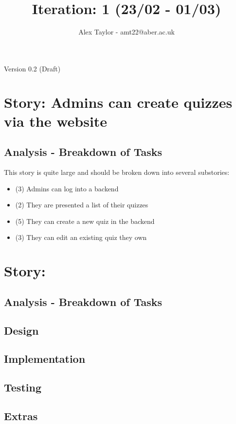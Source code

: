 \documentclass{article}
\title{Iteration: 1 (23/02 - 01/03)}
\author{Alex Taylor - amt22@aber.ac.uk}
\begin{document}
\maketitle
\begin{center}
	Version 0.2 (Draft)
\end{center}
\tableofcontents
\thispagestyle{empty}
\newpage

\section{Story: Admins can create quizzes via the website}
\subsection{Analysis - Breakdown of Tasks}
This story is quite large and should be broken down into several substories:
\begin{itemize}
	\item (3) Admins can log into a backend
	\item (2) They are presented a list of their quizzes
	\item (5) They can create a new quiz in the backend
	\item (3) They can edit an existing quiz they own
\end{itemize}
\newpage

\section{Story: }
\subsection{Analysis - Breakdown of Tasks}
\subsection{Design}
\subsection{Implementation}
\subsection{Testing}
\subsection{Extras}
\newpage

%
%
\end{document}
